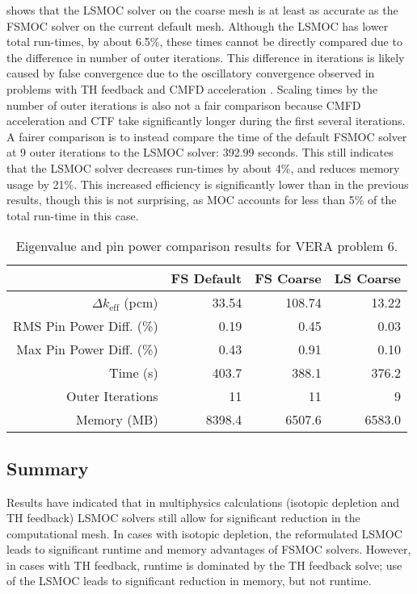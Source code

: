 {{{             shows that the \ac{LSMOC} solver on the coarse mesh is at least as accurate as the \ac{FSMOC} solver on the current default mesh.
            Although the \ac{LSMOC} has lower total run-times, by about 6.5\%, these times cannot be directly compared due to the difference in number of outer iterations.
            This difference in iterations is likely caused by false convergence due to the oscillatory convergence observed in problems with \ac{TH} feedback and \ac{CMFD} acceleration \cite{Kochunas2017}.
            Scaling times by the number of outer iterations is also not a fair comparison because CMFD acceleration and CTF take significantly longer during the first several iterations.
            A fairer comparison is to instead compare the time of the default \ac{FSMOC} solver at 9 outer iterations to the \ac{LSMOC} solver: 392.99 seconds.
            This still indicates that the \ac{LSMOC} solver decreases run-times by about 4\%, and reduces memory usage by 21\%.
            This increased efficiency is significantly lower than in the previous results, though this is not surprising, as \ac{MOC} accounts for less than 5\% of the total run-time in this case.
            \begin{table}[h]
                \centering
                \caption{Eigenvalue and pin power comparison results for VERA problem 6.}
                \label{tab:Results:LSA:Assembly Results}
                \begin{tabular}{rrrr}
                                                & FS Default & FS Coarse & LS Coarse\\\toprule
                    $\Delta k_\text{eff}$ (pcm) &  33.54     & 108.74    & 13.22\\
                    RMS Pin Power Diff. (\%)    &   0.19     &   0.45    &  0.03\\
                    Max Pin Power Diff. (\%)    &   0.43     &   0.91    &  0.10\\
                    Time (s)                    &   403.7    & 388.1     & 376.2\\
                    Outer Iterations            &   11       & 11        & 9\\
                    Memory (MB)                 & 8398.4     & 6507.6    & 6583.0\\\bottomrule
                \end{tabular}
            \end{table}
        }
        \subsection{Summary}{\label{ssec:Results:LSA:Summary}
            Results have indicated that in multiphysics calculations (isotopic depletion and \ac{TH} feedback) \ac{LSMOC} solvers still allow for significant reduction in the computational mesh.
            In cases with isotopic depletion, the reformulated \ac{LSMOC} \cite{Fitzgerald2019} leads to significant runtime and memory advantages of \ac{FSMOC} solvers.
            However, in cases with \ac{TH} feedback, runtime is dominated by the \ac{TH} feedback solve; use of the \ac{LSMOC} leads to significant reduction in memory, but not runtime.

}}}
